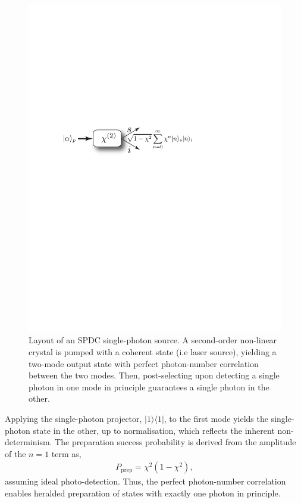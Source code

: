 \documentclass[aps,rmp,twocolumn,amsmath,amssymb,nofootinbib,superscriptaddress,longbibliography,floatfix,table-of-contents,eqsecnum]{revtex4-1}
\newcommand{\bra}[1]{\langle#1|}
\newcommand{\ket}[1]{|#1\rangle}
\begin{document}
\begin{figure}[!htb]
\includegraphics[width=0.9\columnwidth]{SPDC_source}
\caption{Layout of an SPDC single-photon source. A second-order non-linear crystal is pumped with a coherent state (i.e laser source), yielding a two-mode output state with perfect photon-number correlation between the two modes. Then, post-selecting upon detecting a single photon in one mode in principle guarantees a single photon in the other.} \label{fig:SPDC_source}
\end{figure}

Applying the single-photon projector, \mbox{$\ket{1}\bra{1}$}, to the first mode yields the single-photon state in the other, up to normalisation, which reflects the inherent non-determinism. The preparation success probability is derived from the amplitude of the \mbox{$n=1$} term as,
\begin{align} \label{eq:SPDC_p_prep}
P_\text{prep}=\chi^2(1-\chi^2),
\end{align}
assuming ideal photo-detection. Thus, the perfect photon-number correlation enables heralded preparation of states with exactly one photon in principle.
\end{document}
